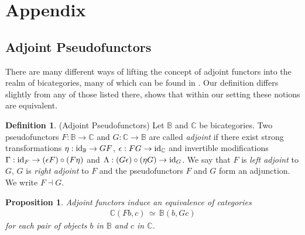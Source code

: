 \documentclass[12pt,oneside,reqno,a4paper]{article}
\newtheorem{proposition}[theorem]{Proposition}
\theoremstyle{definition}
\newtheorem{definition}[theorem]{Definition}
\renewcommand{\equiv}{\,\simeq\,}
\newcommand{\id}{\textup{id}}
\newcommand{\bB}{\mathbb{B}}
\newcommand{\bC}{\mathbb{C}}
\begin{document}
\section{Appendix}

\subsection{Adjoint Pseudofunctors} \label{2adj}

There are many different ways of lifting the concept of adjoint functors into the realm of bicategories, many of which can be found in \cite[Chapter I,7]{G}. Our definition differs slightly from any of those listed there, \cite[Theorem 4.3.11.]{RV} shows that within our setting these notions are equivalent.

\begin{definition}{(Adjoint Pseudofunctors)}
Let $\bB$ and $\bC$ be bicategories. Two pseu\-do\-functors $F:\bB\to\bC$ and $G:\bC\to\bB$ are called \textit{adjoint} if there exist strong transformations $\eta:\id_\bB\to GF$, $\epsilon:FG\to\id_\bC$ and invertible modifications $\Gamma:\id_F \to (\epsilon F)\circ (F\eta)$ and $\Lambda:(G\epsilon)\circ (\eta G)\to \id_G$. We say that $F$ is \textit{left adjoint} to $G$, $G$ is \textit{right adjoint} to $F$ and the pseudofunctors $F$ and $G$ form an adjunction. We write $F\dashv G$.
\end{definition}

\begin{proposition} \label{2adjequiv}
Adjoint functors induce an equivalence of categories
\begin{align*}
\bC(Fb,c)\equiv \bB(b,Gc)
\end{align*}
for each pair of objects $b$ in $\bB$ and $c$ in $\bC$.
\end{proposition}
\end{document}
